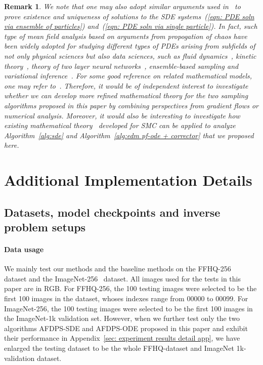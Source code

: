 \documentclass{article}
\numberwithin{equation}{section}
\newtheorem{remark}[theorem]{Remark}
\def\eqref#1{(\ref{#1})}
\begin{document}
\begin{remark}
We note that one may also adopt similar arguments used in~\cite{domingo2020mean} to prove existence and uniqueness of solutions to the SDE systems~\eqref{eqn: PDE soln via ensemble of particles} and~\eqref{eqn: PDE soln via single particle}. In fact, such type of mean field analysis based on arguments from propogation of chaos have been widely adopted for studying different types of PDEs arising from subfields of not only physical sciences but also data sciences, such as fluid dynamics~\cite{goodman1990convergence}, kinetic theory~\cite{carrillo2021wasserstein,borghi2025wasserstein}, theory of two layer neural networks~\cite{mei2019mean,hu2021mean}, ensemble-based sampling and variational inference~\cite{lu2019scaling, kelly2014well,schillings2017analysis,schillings2018convergence,ding2021ensemble1,ding2021ensemble2}. For some good reference on related mathematical models, one may refer to~\cite{muntean2016macroscopic}. Therefore, it would be of independent interest to investigate whether we can develop more refined mathematical theory for the two sampling algorithms proposed in this paper by combining perspectives from gradient flows or numerical analysis. Moreover, it would also be interesting to investigate how existing mathematical theory~\cite{eberle2006convergence,schweizer2012non,eberle2013quantitative,beskos2014error,beskos2014stability,beskos2016convergence,giraud2017nonasymptotic} developed for SMC can be applied to analyze Algorithm~\ref{alg:sde} and Algorithm~\ref{alg:edm pf-ode + corrector} that we proposed here. 
\end{remark}


\section{Additional Implementation Details}
\label{sec: implementation detail app}
\subsection{Datasets, model checkpoints and inverse problem setups}
\paragraph{Data usage} We mainly test our methods and the baseline methods on the FFHQ-256~\cite{karras2019style} dataset and the ImageNet-256~\cite{deng2009imagenet} dataset. All images used for the tests in this paper are in RGB. For FFHQ-256, the 100 testing images were selected to be the first 100 images in the dataset, whoses indexes range from $00000$ to $00099$. For ImageNet-256, the 100 testing images were selected to be the first 100 images in the ImageNet-1k validation set. However, when we further test only the two algorithms AFDPS-SDE and AFDPS-ODE proposed in this paper and exhibit their performance in Appendix~\ref{sec: experiment results detail app}, we have enlarged the testing dataset to be the whole FFHQ-dataset and ImageNet 1k-validation dataset. 
\end{document}
